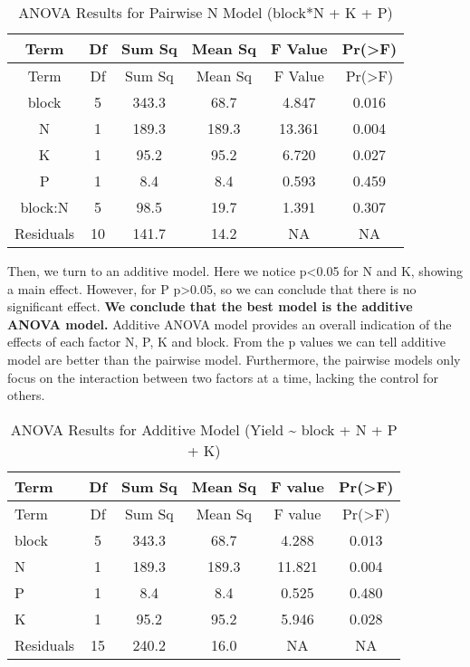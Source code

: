 \documentclass[
]{article}
\begin{document}
\begin{longtable}[]{@{}cccccc@{}}
\caption{ANOVA Results for Pairwise N Model (block*N + K +
P)}\tabularnewline
\toprule\noalign{}
Term & Df & Sum Sq & Mean Sq & F Value & Pr(\textgreater F) \\
\midrule\noalign{}
\endfirsthead
\toprule\noalign{}
Term & Df & Sum Sq & Mean Sq & F Value & Pr(\textgreater F) \\
\midrule\noalign{}
\endhead
\bottomrule\noalign{}
\endlastfoot
block & 5 & 343.3 & 68.7 & 4.847 & 0.016 \\
N & 1 & 189.3 & 189.3 & 13.361 & 0.004 \\
K & 1 & 95.2 & 95.2 & 6.720 & 0.027 \\
P & 1 & 8.4 & 8.4 & 0.593 & 0.459 \\
block:N & 5 & 98.5 & 19.7 & 1.391 & 0.307 \\
Residuals & 10 & 141.7 & 14.2 & NA & NA \\
\end{longtable}

Then, we turn to an additive model. Here we notice p\textless0.05 for N
and K, showing a main effect. However, for P p\textgreater0.05, so we
can conclude that there is no significant effect. \textbf{We conclude
that the best model is the additive ANOVA model.} Additive ANOVA model
provides an overall indication of the effects of each factor N, P, K and
block. From the p values we can tell additive model are better than the
pairwise model. Furthermore, the pairwise models only focus on the
interaction between two factors at a time, lacking the control for
others.

\begin{longtable}[]{@{}lccccc@{}}
\caption{ANOVA Results for Additive Model (Yield \textasciitilde{} block
+ N + P + K)}\tabularnewline
\toprule\noalign{}
Term & Df & Sum Sq & Mean Sq & F value & Pr(\textgreater F) \\
\midrule\noalign{}
\endfirsthead
\toprule\noalign{}
Term & Df & Sum Sq & Mean Sq & F value & Pr(\textgreater F) \\
\midrule\noalign{}
\endhead
\bottomrule\noalign{}
\endlastfoot
block & 5 & 343.3 & 68.7 & 4.288 & 0.013 \\
N & 1 & 189.3 & 189.3 & 11.821 & 0.004 \\
P & 1 & 8.4 & 8.4 & 0.525 & 0.480 \\
K & 1 & 95.2 & 95.2 & 5.946 & 0.028 \\
Residuals & 15 & 240.2 & 16.0 & NA & NA \\
\end{longtable}
\end{document}

